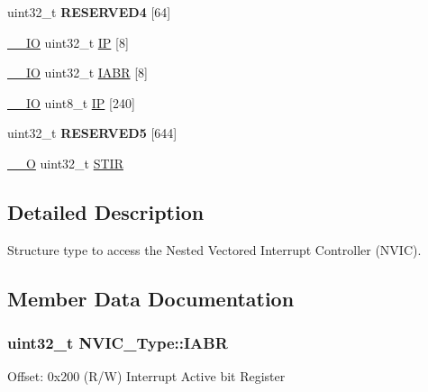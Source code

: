 \begin{DoxyCompactItemize}
\item 
uint32\+\_\+t {\bfseries R\+E\+S\+E\+R\+V\+E\+D4} \mbox{[}64\mbox{]}\hypertarget{struct_n_v_i_c___type_a712f552dc4649746daadfe9b86d88665}{}\label{struct_n_v_i_c___type_a712f552dc4649746daadfe9b86d88665}

\item 
\hyperlink{core__sc300_8h_aec43007d9998a0a0e01faede4133d6be}{\+\_\+\+\_\+\+IO} uint32\+\_\+t \hyperlink{struct_n_v_i_c___type_aa7d4c60e9bbf4b3d07a6b3ba39a7d7d9}{IP} \mbox{[}8\mbox{]}
\item 
\hyperlink{core__sc300_8h_aec43007d9998a0a0e01faede4133d6be}{\+\_\+\+\_\+\+IO} uint32\+\_\+t \hyperlink{struct_n_v_i_c___type_ac86c5bac0af593beb8004ab0ff9097bc}{I\+A\+BR} \mbox{[}8\mbox{]}
\item 
\hyperlink{core__sc300_8h_aec43007d9998a0a0e01faede4133d6be}{\+\_\+\+\_\+\+IO} uint8\+\_\+t \hyperlink{struct_n_v_i_c___type_a6524789fedb94623822c3e0a47f3d06c}{IP} \mbox{[}240\mbox{]}
\item 
uint32\+\_\+t {\bfseries R\+E\+S\+E\+R\+V\+E\+D5} \mbox{[}644\mbox{]}\hypertarget{struct_n_v_i_c___type_ad0598b9cd851203ff328a9c7c347f1b6}{}\label{struct_n_v_i_c___type_ad0598b9cd851203ff328a9c7c347f1b6}

\item 
\hyperlink{core__sc300_8h_a7e25d9380f9ef903923964322e71f2f6}{\+\_\+\+\_\+O} uint32\+\_\+t \hyperlink{struct_n_v_i_c___type_a0b0d7f3131da89c659a2580249432749}{S\+T\+IR}
\end{DoxyCompactItemize}


\subsection{Detailed Description}
Structure type to access the Nested Vectored Interrupt Controller (N\+V\+IC). 

\subsection{Member Data Documentation}
\subsubsection[{\texorpdfstring{I\+A\+BR}{IABR}}]{ uint32\+\_\+t N\+V\+I\+C\+\_\+\+Type\+::\+I\+A\+BR}\hypertarget{struct_n_v_i_c___type_ac86c5bac0af593beb8004ab0ff9097bc}{}\label{struct_n_v_i_c___type_ac86c5bac0af593beb8004ab0ff9097bc}
Offset\+: 0x200 (R/W) Interrupt Active bit Register 
